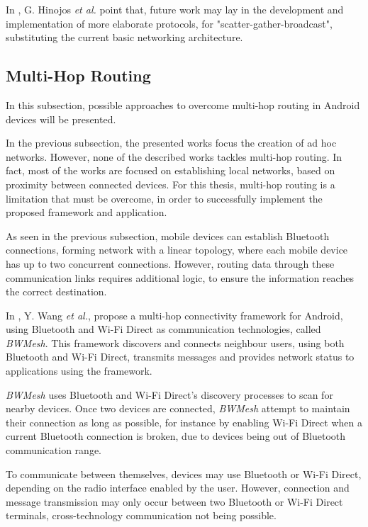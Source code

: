 In \cite{bluehoc}, G. Hinojos \textit{et al.} point that, future work may lay in the development and implementation of more elaborate protocols, for "scatter-gather-broadcast", substituting the current basic networking architecture.

\subsection{Multi-Hop Routing}

In this subsection, possible approaches to overcome multi-hop routing in Android devices will be presented.

In the previous subsection, the presented works focus the creation of ad hoc networks. However, none of the described works tackles multi-hop routing. In fact, most of the works are focused on establishing local networks, based on proximity between connected devices. For this thesis, multi-hop routing is a limitation that must be overcome, in order to successfully implement the proposed framework and application.

As seen in the previous subsection, mobile devices can establish Bluetooth connections, forming network with a linear topology, where each mobile device has up to two concurrent connections. However, routing data through these communication links requires additional logic, to ensure the information reaches the correct destination.

In \cite{bwmesh}, Y. Wang \textit{et al.}, propose a multi-hop connectivity framework for Android, using Bluetooth and Wi-Fi Direct as communication technologies, called \textit{BWMesh}. This framework discovers and connects neighbour users, using both Bluetooth and Wi-Fi Direct, transmits messages and provides network status to applications using the framework.

\textit{BWMesh} uses Bluetooth and Wi-Fi Direct's discovery processes to scan for nearby devices. Once two devices are connected, \textit{BWMesh} attempt to maintain their connection as long as possible, for instance by enabling Wi-Fi Direct when a current Bluetooth connection is broken, due to devices being out of Bluetooth communication range.

To communicate between themselves, devices may use Bluetooth or Wi-Fi Direct, depending on the radio interface enabled by the user. However, connection and message transmission may only occur between two Bluetooth or Wi-Fi Direct terminals, cross-technology communication not being possible.

